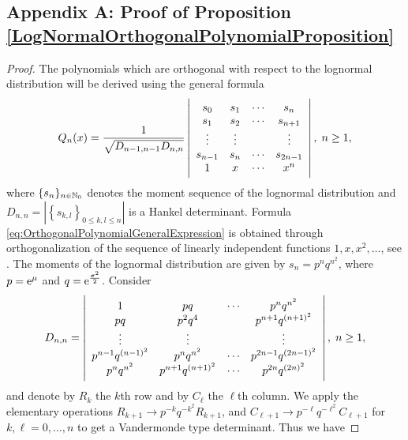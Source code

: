 \begin{subappendices}
\section*{Appendix A: Proof of Proposition \ref{LogNormalOrthogonalPolynomialProposition}}
\begin{proof}
The polynomials which are orthogonal with respect to the lognormal distribution will be derived using the general formula
\begin{equation}\label{eq:OrthogonalPolynomialGeneralExpression}
Q_{n}(x)=\frac{1}{\sqrt{D_{n-1,n-1}D_{n,n}}}\displaystyle
\left| \begin{array}{cccc}
s_{0}&s_{1}&\cdots&s_{n} \\
s_{1}&s_{2}&\cdots&s_{n+1}  \\
\vdots&\vdots&&\vdots\\
s_{n-1}&s_{n}&\cdots&s_{2n-1}\\
1&x&\cdots&x^{n}
\end{array}
\right|,\hspace{0.1cm}n\geq1,
\end{equation}
where $\{s_{n}\}_{n\in\mathbb{N}_0}$ denotes the moment sequence of the lognormal distribution and  $D_{n,n}=\left|\left\{s_{k,l}\right\}_{0\leq k,l \leq n}\right|$ is a Hankel determinant. Formula \eqref{eq:OrthogonalPolynomialGeneralExpression} is obtained through orthogonalization of the sequence of linearly independent functions $1,x,x^{2},\ldots$, see \cite[pp.\ 26--27]{Szegoe1939}. The moments of the lognormal distribution are given by $s_{n}=p^{n}q^{n^{2}}$, where $p=\mathrm{e}^{\mu}$ and $q=\mathrm{e}^{\frac{\sigma^{2}}{2}}$. Consider
\begin{equation}\label{eq:Dn1}
D_{n,n}=\displaystyle
\left| \begin{array}{cccc}
1&pq&\cdots&p^{n}q^{n^{2}} \\
pq&p^{2}q^{4}&&p^{n+1}q^{(n+1)^{2}}\\
\vdots&\vdots&&\vdots\\
p^{n-1}q^{(n-1)^{2}}&p^{n}q^{n^{2}}&\cdots&p^{2n-1}q^{(2n-1)^{2}}\\
p^{n}q^{n^{2}}&p^{n+1}q^{(n+1)^{2}}&\cdots&p^{2n}q^{(2n)^{2}}
\end{array}
\right|,\hspace{0.1cm}n\geq1,
\end{equation}
and denote by $R_{k}$ the $k$th row and by $C_{\ell}$ the $\ell$th column. We apply the elementary operations $R_{k+1}\rightarrow p^{-k}q^{-k^{2}}R_{k+1}$, and $C_{\ell+1}\rightarrow p^{-\ell}q^{-\ell^{2}}C_{\ell+1}$ for $k,\ell=0,\ldots,n$ to get a Vandermonde type determinant. Thus we have

\end{proof}
\end{subappendices}

